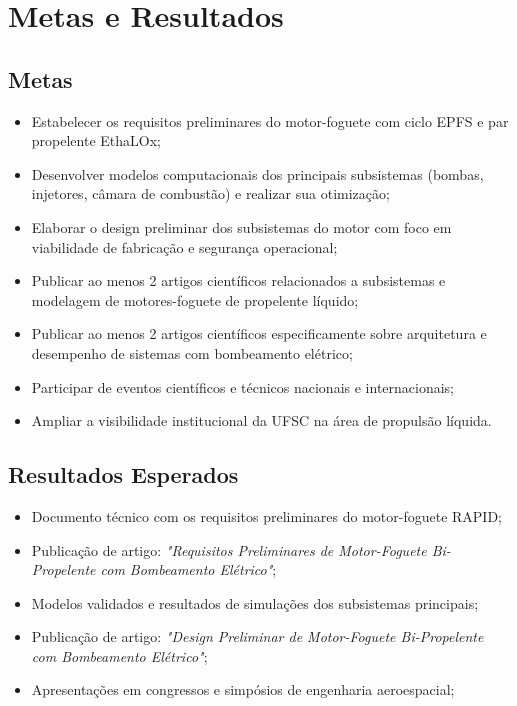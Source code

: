 \chapter{Metas e Resultados}

\section{Metas}

\begin{itemize}
    \item Estabelecer os requisitos preliminares do motor-foguete com ciclo \gls{EPFS} e par propelente \Gls{EthaLOx};
    \item Desenvolver modelos computacionais dos principais subsistemas (bombas, injetores, câmara de combustão) e realizar sua otimização;
    \item Elaborar o design preliminar dos subsistemas do motor com foco em viabilidade de fabricação e segurança operacional;
    \item Publicar ao menos 2 artigos científicos relacionados a subsistemas e modelagem de motores-foguete de propelente líquido;
    \item Publicar ao menos 2 artigos científicos especificamente sobre arquitetura e desempenho de sistemas com bombeamento elétrico;
    \item Participar de eventos científicos e técnicos nacionais e internacionais;
    \item Ampliar a visibilidade institucional da UFSC na área de propulsão líquida.
\end{itemize}

\section{Resultados Esperados}

\begin{itemize}
    \item Documento técnico com os requisitos preliminares do motor-foguete RAPID;
    \item Publicação de artigo: \textit{"Requisitos Preliminares de Motor-Foguete Bi-Propelente com Bombeamento Elétrico"};
    \item Modelos validados e resultados de simulações dos subsistemas principais;
    \item Publicação de artigo: \textit{"Design Preliminar de Motor-Foguete Bi-Propelente com Bombeamento Elétrico"};
    \item Apresentações em congressos e simpósios de engenharia aeroespacial;
\end{itemize}